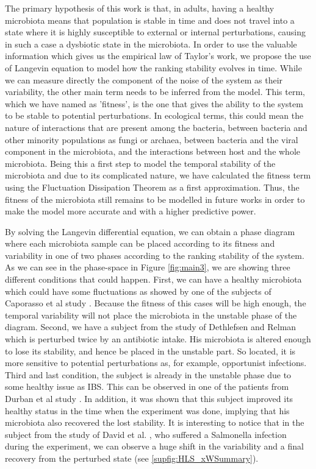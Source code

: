 The primary hypothesis of this work is that, in adults, having a healthy microbiota means that population is stable in time and does not travel into a state where it is highly susceptible to external or internal perturbations, causing in such a case a dysbiotic state in the microbiota. In order to use the valuable information which gives us the empirical law of Taylor's work, we propose the use of Langevin equation to model how the ranking stability evolves in time. While we can measure directly the component of the noise of the system as their variability, the other main term needs to be inferred from the model. This term, which we have named as 'fitness', is the one that gives the ability to the system to be stable to potential perturbations. In ecological terms, this could mean the nature of interactions that are present among the bacteria, between bacteria and other minority populations as fungi or archaea, between bacteria and the viral component in the microbiota, and the interactions between host and the whole microbiota. Being this a first step to model the temporal stability of the microbiota and due to its complicated nature, we have calculated the fitness term using the Fluctuation Dissipation Theorem as a first approximation\cite{FD}. Thus, the fitness of the microbiota still remains to be modelled in future works in order to make the model more accurate and with a higher predictive power. 

By solving the Langevin differential equation, we can obtain a phase diagram where each microbiota sample can be placed according to its fitness and variability in one of two phases according to the ranking stability of the system. As we can see in the phase-space in Figure \ref{fig:main3}, we are showing three different conditions that could happen. First, we can have a healthy microbiota which could have some fluctuations as showed by one of the subjects of Caporasso et al study \cite{moving}. Because the fitness of this cases will be high enough, the temporal variability will not place the microbiota in the unstable phase of the diagram. Second, we have a subject from the study of Dethlefsen and Relman \cite{antibiotic} which is perturbed twice by an antibiotic intake. His microbiota is altered enough to lose its stability, and hence be placed in the unstable part. So located, it is more sensitive to potential perturbations as, for example, opportunist infections. Third and last condition, the subject is already in the unstable phase due to some healthy issue as IBS. This can be observed in one of the patients from Durban et al study \cite{IBS}. In addition, it was shown that this subject improved its healthy status in the time when the experiment was done, implying that his microbiota also recovered the lost stability. It is interesting to notice that in the subject from the study of David et al. \cite{hostlife}, who suffered a Salmonella infection during the experiment, we can observe a huge shift in the variability and a final recovery from the perturbed state (see \ref{supfig:HLS_xWSummary}).

